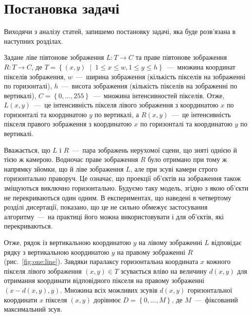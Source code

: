 \section{Постановка задачі}

Виходячи з аналізу статей, запишемо постановку задачі,
яка буде розв'язана в наступних розділах.

Задане ліве півтонове зображення $L : T \to C$
та праве півтонове зображення $R : T \to C$,
де
$T = \left\{
    \left( x, y \right) \; \middle| \; 1 \le x \le w, 1 \le y \le h
\right\}$~---~множина координат пікселів зображення,
$w$~---~ширина зображення (кількість пікселів на зображенні по горизонталі),
$h$~---~висота зображення (кількість пікселів на зображенні по вертикалі),
$C = \left\{ 0, \dotsc, 255 \right\} $~---~множина інтенсивностей пікселів.
Отже,
$L \left(x, y \right)$~---~це інтенсивність пікселя лівого зображення
з координатою $x$ по горизонталі та координатою $y$ по вертикалі,
а $R \left( x, y \right)$~---~це інтенсивність пікселя правого зображення
з координатою $x$ по горизонталі та координатою $y$ по вертикалі.

Вважається, що $L$ і $R$~---~пара зображень нерухомої сцени,
що зняті однією й тією ж камерою.
Водночас праве зображення $R$ було отримано при тому ж напрямку зйомки,
що й ліве зображення $L$, але при зсуві камери строго горизонтально праворуч.
Це означає,
що проекції об'єктів на зображення також зміщуються виключно горизонтально.
Будуємо таку модель, згідно з якою об'єкти не перекриваються один одним.
В експериментах, що наведені в четвертому розділі дисертації, показано,
що це не сильно обмежує застосування алгоритму~---~на практиці його можна
використовувати і для об'єктів, які перекриваються.

Отже, рядок із вертикальною координатою $y$
на лівому зображенні $L$ відповідає
рядку з вертикальною координатою $y$ на правому зображенні $R$
(рис.~\ref{fig:one:line}).
Завдяки паралаксу горизонтальна координата $x$
кожного пікселя лівого зображення $\left( x, y \right) \in T$
зсувається вліво на величину $d \left(x, y \right) $
для отримання координати відповідного пікселя на правому зображенні
$\left( x - d \left(x, y \right), y \right)$.
Множина всіх можливих зсувів $d \left(x, y \right)$
горизонтальної координати $x$ пікселя $\left(x, y \right)$ дорівнює
$D = \left\{ 0, \dotsc, M \right\}$, де $M$~---~фіксований максимальний зсув.

